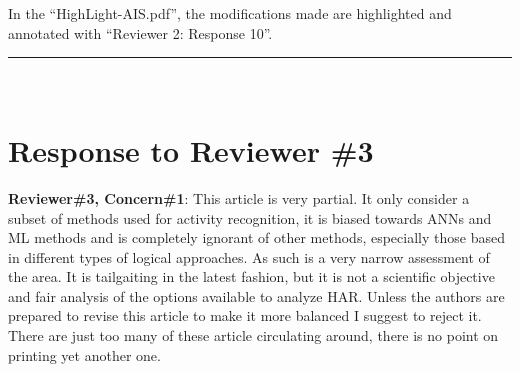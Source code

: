 \documentclass[Afour,sageh,times]{sagej}
\begin{document}
\textcolor{myOrange}{
In the “HighLight-AIS.pdf”, the modifications made are highlighted and annotated with “Reviewer 2: Response 10”. }\\ 


\color{gray}\rule{\linewidth}{1pt}\normalcolor\\

\section*{Response to Reviewer \#3}  

\textcolor{myGreen}{ \textbf{Reviewer\#3, Concern\#1}: This article is very partial. It only consider a subset of methods used for activity recognition, it is biased towards ANNs and ML methods and is completely ignorant of other methods, especially those based in different types of logical approaches. As such is a very narrow assessment of the area. It is tailgaiting in the latest fashion, but it is not a scientific objective and fair analysis of the options available to analyze HAR. Unless the authors are prepared to revise this article to make it more balanced I suggest to reject it. There are just too many of these article circulating around, there is no point on printing yet another one.}  \\
\end{document}
